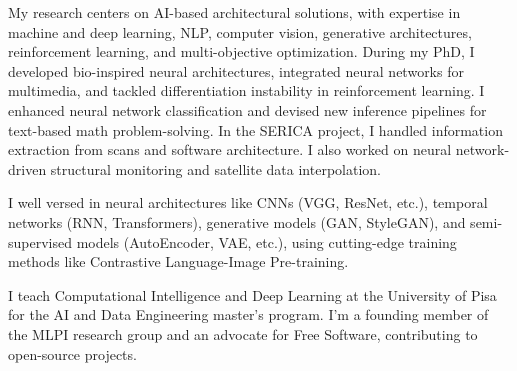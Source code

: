 My research centers on AI-based architectural solutions, with expertise in machine and deep learning, NLP, computer vision, generative architectures, reinforcement learning, and multi-objective optimization. During my PhD, I developed bio-inspired neural architectures, integrated neural networks for multimedia, and tackled differentiation instability in reinforcement learning. I enhanced neural network classification and devised new inference pipelines for text-based math problem-solving. In the SERICA project, I handled information extraction from scans and software architecture. I also worked on neural network-driven structural monitoring and satellite data interpolation.   

I well versed in neural architectures like CNNs (VGG, ResNet, etc.), temporal networks (RNN, Transformers), generative models (GAN, StyleGAN), and semi-supervised models (AutoEncoder, VAE, etc.), using cutting-edge training methods like Contrastive Language-Image Pre-training.   

I teach Computational Intelligence and Deep Learning at the University of Pisa for the AI and Data Engineering master's program. I'm a founding member of the MLPI research group and an advocate for Free Software, contributing to open-source projects. 